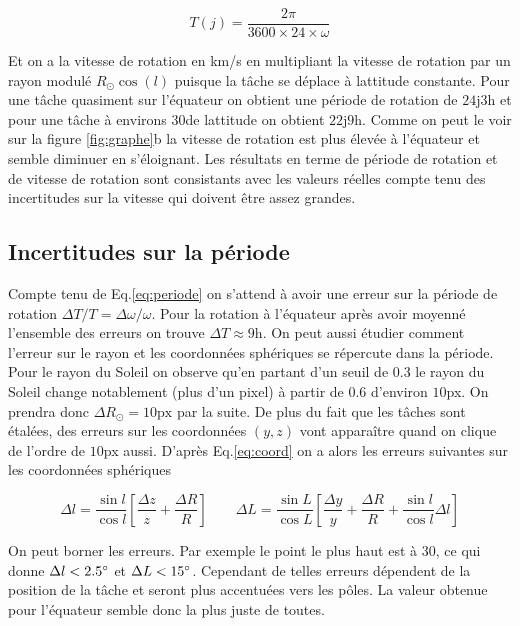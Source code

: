 \documentclass[a4paper,11pt]{article}
\numberwithin{equation}{section}
\begin{document}
\begin{equation}
  \label{eq:periode}
  T(j)= \frac{2\pi}{3600 \times 24 \times \omega}  
\end{equation}

Et on a la vitesse de rotation en km/s en multipliant la vitesse de rotation par un rayon modulé $R_{\odot} \cos(l)$ puisque la tâche se déplace à lattitude constante. Pour une tâche quasiment sur l'équateur on obtient une période de rotation de $24\text{j}3\text{h}$ et pour une tâche à environs $30$\degree de lattitude on obtient $22\text{j}9\text{h}$. Comme on peut le voir sur la figure \ref{fig:graphe}b la vitesse de rotation est plus élevée à l'équateur et semble diminuer en s'éloignant. Les résultats en terme de période de rotation et de vitesse de rotation sont consistants avec les valeurs réelles compte tenu des incertitudes sur la vitesse qui doivent être assez grandes.

\subsection{Incertitudes sur la période}
Compte tenu de Eq.\ref{eq:periode} on s'attend à avoir une erreur sur la période de rotation $\Delta T / T =   \Delta \omega / \omega$. Pour la rotation à l'équateur après avoir moyenné l'ensemble des erreurs on trouve $\Delta T \approx 9 \text{h}$.\newline
On peut aussi étudier comment l'erreur sur le rayon et les coordonnées sphériques se répercute dans la période. Pour le rayon du Soleil on observe qu'en partant d'un seuil de 0.3 le rayon du Soleil change notablement (plus d'un pixel) à partir de 0.6 d'environ $10$px. On prendra donc $\Delta R_{\odot} = 10\text{px}$ par la suite. De plus du fait que les tâches sont étalées, des erreurs sur les coordonnées $(y,z)$ vont apparaître quand on clique de l'ordre de $10$px aussi.\newline
D'après Eq.\ref{eq:coord} on a alors les erreurs suivantes sur les coordonnées sphériques

\begin{equation}
  \Delta l = \frac{\sin l}{\cos l} \left [\frac{\Delta z}{z} + \frac{\Delta R}{R} \right ] \qquad \Delta L = \frac{\sin L}{\cos L} \left [\frac{\Delta y}{y} + \frac{\Delta R}{R} + \frac{\sin l}{\cos l}\Delta l \right ]
\end{equation}

On peut borner les erreurs. Par exemple le point le plus haut est à $30$\degree, ce qui donne $\Delta l < 2.5 \degree$ et $\Delta L < 15 \degree$. Cependant de telles erreurs dépendent de la position de la tâche et seront plus accentuées vers les pôles. La valeur obtenue pour l'équateur semble donc la plus juste de toutes.
\end{document}
